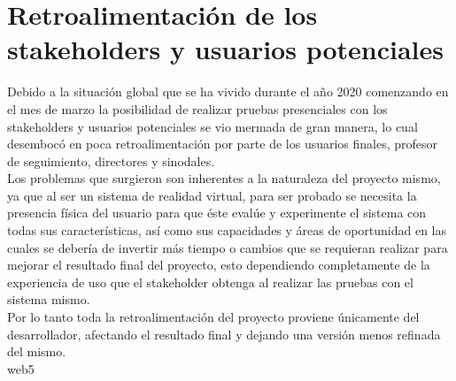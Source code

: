 \section{Retroalimentación de los stakeholders y usuarios potenciales}
Debido a la situación global que se ha vivido durante el año 2020 comenzando en el mes de marzo la posibilidad de realizar pruebas presenciales con los stakeholders y usuarios potenciales se vio mermada de gran manera, lo cual desembocó en poca retroalimentación por parte de los usuarios finales, profesor de seguimiento, directores y sinodales. \\
Los problemas que surgieron son inherentes a la naturaleza del proyecto mismo, ya que al ser un sistema de realidad virtual, para ser probado se necesita la presencia física del usuario para que éste evalúe y experimente el sistema con todas sus características, así como sus capacidades y áreas de oportunidad en las cuales se debería de invertir más tiempo o cambios que se requieran realizar para mejorar el resultado final del proyecto, esto dependiendo completamente de la experiencia  de uso que el stakeholder obtenga al realizar las pruebas con el sistema mismo.\\
Por lo tanto toda la retroalimentación del proyecto proviene únicamente del desarrollador, afectando el resultado final y dejando una versión menos refinada del mismo.\\
web5
